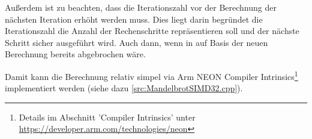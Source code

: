 Außerdem ist zu beachten, dass die Iterationszahl vor der Berechnung der nächsten Iteration erhöht werden muss.
Dies liegt darin begründet die Iterationszahl die Anzahl der Rechenschritte repräsentieren soll und
der nächste Schritt sicher ausgeführt wird. Auch dann, wenn in auf Basis der neuen Berechnung bereits abgebrochen wäre.

\begin{figure}[h!]
	
\end{figure}

Damit kann die Berechnung relativ simpel via Arm NEON Compiler Intrinsics\footnote{Details im Abschnitt 'Compiler Intrinsics' unter \url{https://developer.arm.com/technologies/neon}} implementiert werden (siehe dazu \autoref{src:MandelbrotSIMD32.cpp}).

